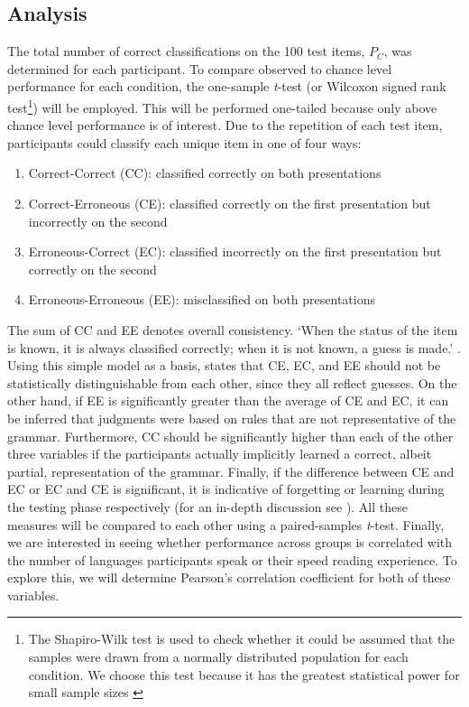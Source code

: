 \subsection{Analysis}
The total number of correct classifications on the 100 test items, $P_{C}$, was determined for each participant. To compare observed to chance level performance for each condition, the one-sample \textit{t}-test (or Wilcoxon signed rank test\footnote{The Shapiro-Wilk test is used to check whether it could be assumed that the samples were drawn from a normally distributed population for each condition. We choose this test because it has the greatest statistical power for small sample sizes \citep{yazici2007comparison}}) will be employed. This will be performed one-tailed because only above chance level performance is of interest.
Due to the repetition of each test item, participants could classify each unique item in one of four ways:
\begin{enumerate}
\item Correct-Correct (CC): classified correctly on both presentations
\item Correct-Erroneous (CE): classified correctly on the first presentation but incorrectly on the second
\item Erroneous-Correct (EC): classified incorrectly on the first presentation but correctly on the second
\item Erroneous-Erroneous (EE): misclassified on both presentations
\end{enumerate}
The sum of CC and EE denotes overall consistency. `When the status of the item is known, it is always classified correctly; when it is not known, a guess is made.' \citep[p.~227]{reber1989implicit}. Using this simple model as a basis, \citeauthor{reber1989implicit} states that CE, EC, and EE should not be statistically distinguishable from each other, since they all reflect guesses. On the other hand, if EE is significantly greater than the average of CE and EC, it can be inferred that judgments were based on rules that are not representative of the grammar. Furthermore, CC should be significantly higher than each of the other three variables if the participants actually implicitly learned a correct, albeit partial, representation of the grammar. Finally, if the difference between CE and EC or EC and CE is significant, it is indicative of forgetting or learning during the testing phase respectively (for an in-depth discussion see \citet{reber1989implicit}). All these measures will be compared to each other using a paired-samples \textit{t}-test. 
Finally, we are interested in seeing whether performance across groups is correlated with the number of languages participants speak or their speed reading experience. To explore this, we will determine Pearson's correlation coefficient for both of these variables.

